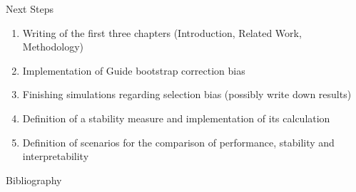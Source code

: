 \documentclass[9pt, xcolor=table]{beamer}
\begin{document}
\begin{frame}{Next Steps}
\begin{enumerate}
    \item Writing of the first three chapters (Introduction, Related Work, Methodology)
    \item Implementation of Guide bootstrap correction bias 
    \item Finishing simulations regarding selection bias (possibly write down results)
    \item Definition of a stability measure and implementation of its calculation
    \item Definition of scenarios for the comparison of performance, stability and interpretability
\end{enumerate}
    
\end{frame}
    


\begin{frame}{Bibliography}
    
    

\end{frame}
\end{document}
